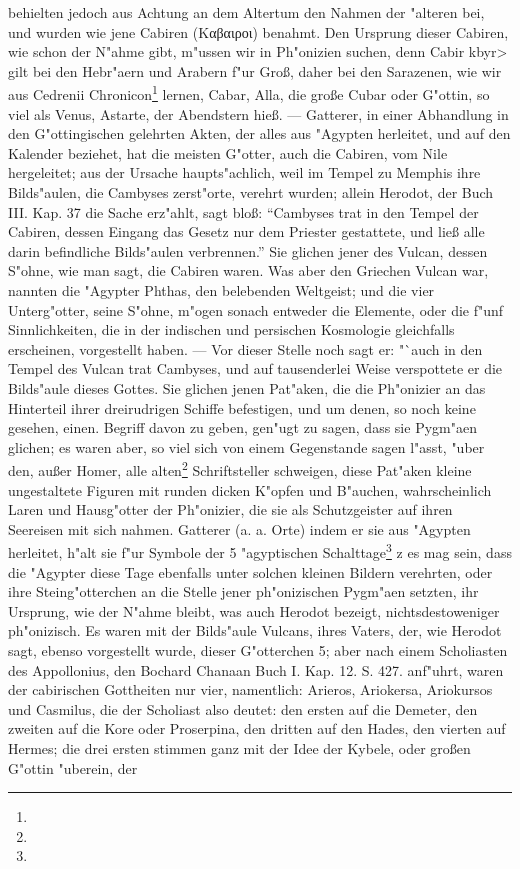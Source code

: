 \documentclass[a4paper, 11pt, oneside, polutonikogreek, german]{article}
\begin{document}
behielten jedoch aus Achtung an dem Altertum den Nahmen der "alteren bei, und wurden wie jene Cabiren (Καβαιροι) benahmt. Den Ursprung dieser Cabiren, wie schon der N"ahme gibt, m"ussen wir in Ph"onizien suchen, denn Cabir \<kbyr> gilt bei den Hebr"aern und Arabern f"ur Groß, daher bei den Sarazenen, wie wir aus Cedrenii Chronicon\footnote{} lernen, Cabar, Alla, die große Cubar oder G"ottin, so viel als Venus, Astarte, der Abendstern hieß. --- Gatterer, in einer Abhandlung in den G"ottingischen gelehrten Akten, der alles aus "Agypten herleitet, und auf den Kalender beziehet, hat die meisten G"otter, auch die Cabiren, vom Nile hergeleitet; aus der Ursache haupts"achlich, weil im Tempel zu Memphis ihre Bilds"aulen, die Cambyses zerst"orte, verehrt wurden; allein Herodot, der Buch III. Kap. 37 die Sache erz"ahlt, sagt bloß: "`Cambyses trat in den Tempel der Cabiren, dessen Eingang das Gesetz nur dem Priester gestattete, und ließ alle darin befindliche Bilds"aulen verbrennen."' Sie glichen jener des Vulcan, dessen S"ohne, wie man sagt, die Cabiren waren. Was aber den Griechen Vulcan war, nannten die "Agypter Phthas, den belebenden Weltgeist; und die vier Unterg"otter, seine S"ohne, m"ogen sonach entweder die Elemente, oder die f"unf Sinnlichkeiten, die in der indischen und persischen Kosmologie gleichfalls erscheinen, vorgestellt haben. --- Vor dieser Stelle noch sagt er: "`auch in den Tempel des Vulcan trat Cambyses, und auf tausenderlei Weise verspottete er die Bilds"aule dieses Gottes. Sie glichen jenen Pat"aken, die die Ph"onizier an das Hinterteil ihrer dreirudrigen Schiffe befestigen, und um denen, so noch keine gesehen, einen. Begriff davon zu geben, gen"ugt zu sagen, dass sie Pygm"aen glichen; es waren aber, so viel sich von einem Gegenstande sagen l"asst, "uber den, außer Homer, alle alten\footnote{} Schriftsteller schweigen, diese Pat"aken kleine ungestaltete Figuren mit runden dicken K"opfen und B"auchen, wahrscheinlich Laren und Hausg"otter der Ph"onizier, die sie als Schutzgeister auf ihren Seereisen mit sich nahmen. Gatterer (a. a. Orte) indem er sie aus "Agypten herleitet, h"alt sie f"ur Symbole der 5 "agyptischen Schalttage\footnote{} z es mag sein, dass die "Agypter diese Tage ebenfalls unter solchen kleinen Bildern verehrten, oder ihre Steing"otterchen an die Stelle jener ph"onizischen Pygm"aen setzten, ihr Ursprung, wie der N"ahme bleibt, was auch Herodot bezeigt, nichtsdestoweniger ph"onizisch. Es waren mit der Bilds"aule Vulcans, ihres Vaters, der, wie Herodot sagt, ebenso vorgestellt wurde, dieser G"otterchen 5; aber nach einem Scholiasten des Appollonius, den Bochard Chanaan Buch I. Kap. 12. S. 427. anf"uhrt, waren der cabirischen Gottheiten nur vier, namentlich: Arieros, Ariokersa, Ariokursos und Casmilus, die der Scholiast also deutet: den ersten auf die Demeter, den zweiten auf die Kore oder Proserpina, den dritten auf den Hades, den vierten auf Hermes; die drei ersten stimmen ganz mit der Idee der Kybele, oder großen G"ottin "uberein, der 
\end{document}
